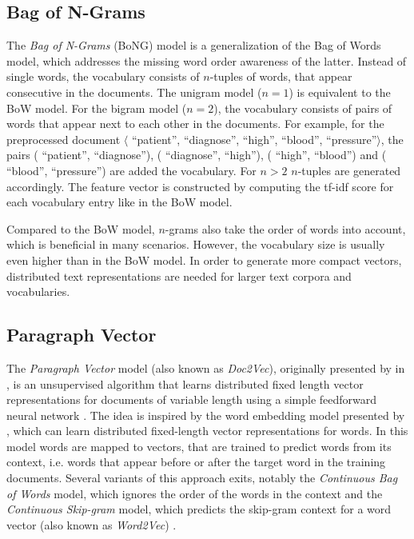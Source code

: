 \subsection{Bag of N-Grams}

The \textit{Bag of N-Grams} (BoNG) model is a generalization of the Bag of Words model, which addresses the missing word order awareness of the latter.
Instead of single words, the vocabulary consists of $n$-tuples of words, that appear consecutive in the documents.
The unigram model ($n=1$) is equivalent to the BoW model.
For the bigram model ($n=2$), the vocabulary consists of pairs of words that appear next to each other in the documents.
For example, for the preprocessed document $\langle$ \enquote{patient},  \enquote{diagnose},  \enquote{high},  \enquote{blood},  \enquote{pressure}$\rangle$, the pairs ( \enquote{patient},  \enquote{diagnose}), ( \enquote{diagnose},  \enquote{high}), ( \enquote{high},  \enquote{blood}) and ( \enquote{blood},  \enquote{pressure}) are added the vocabulary.
For $n>2$ $n$-tuples are generated accordingly.
The feature vector is constructed by computing the tf-idf score for each vocabulary entry like in the BoW model.

Compared to the BoW model, $n$-grams also take the order of words into account, which is beneficial in many scenarios.
However, the vocabulary size is usually even higher than in the BoW model.
In order to generate more compact vectors, distributed text representations are needed for larger text corpora and vocabularies.

\subsection{Paragraph Vector}

The \textit{Paragraph Vector} model (also known as \textit{Doc2Vec}), originally presented by \citeauthor{DBLP:conf/icml/LeM14} in \citeyear{DBLP:conf/icml/LeM14}, is an unsupervised algorithm that learns distributed fixed length vector representations for documents of variable length using a simple feedforward neural network \cite{DBLP:conf/icml/LeM14}.
The idea is inspired by the word embedding model presented by \citeauthor{DBLP:journals/jmlr/BengioDVJ03} \cite{DBLP:journals/jmlr/BengioDVJ03}, which can learn distributed fixed-length vector representations for words.
In this model words are mapped to vectors, that are trained to predict words from its context, i.e. words that appear before or after the target word in the training documents.
Several variants of this approach exits, notably the \textit{Continuous Bag of Words} model, which ignores the order of the words in the context and the \textit{Continuous Skip-gram} model, which predicts the skip-gram context for a word vector (also known as \textit{Word2Vec}) \cite{DBLP:journals/corr/abs-1301-3781}.

